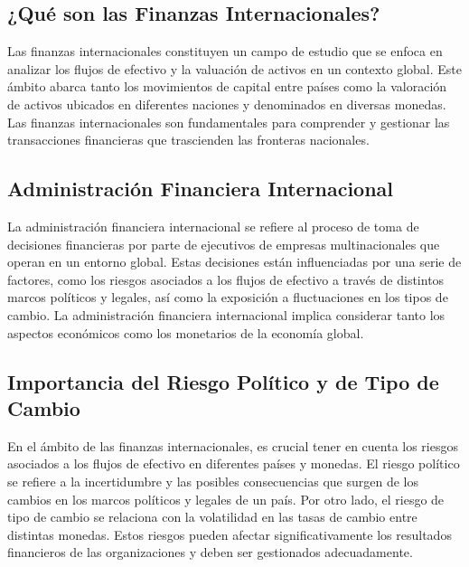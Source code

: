 \documentclass[
  a4paper,
]{article}
\begin{document}
\hypertarget{quuxe9-son-las-finanzas-internacionales}{%
\subsection{¿Qué son las Finanzas
Internacionales?}\label{quuxe9-son-las-finanzas-internacionales}}

Las finanzas internacionales constituyen un campo de estudio que se
enfoca en analizar los flujos de efectivo y la valuación de activos en
un contexto global. Este ámbito abarca tanto los movimientos de capital
entre países como la valoración de activos ubicados en diferentes
naciones y denominados en diversas monedas. Las finanzas internacionales
son fundamentales para comprender y gestionar las transacciones
financieras que trascienden las fronteras nacionales.

\hypertarget{administraciuxf3n-financiera-internacional}{%
\subsection{Administración Financiera
Internacional}\label{administraciuxf3n-financiera-internacional}}

La administración financiera internacional se refiere al proceso de toma
de decisiones financieras por parte de ejecutivos de empresas
multinacionales que operan en un entorno global. Estas decisiones están
influenciadas por una serie de factores, como los riesgos asociados a
los flujos de efectivo a través de distintos marcos políticos y legales,
así como la exposición a fluctuaciones en los tipos de cambio. La
administración financiera internacional implica considerar tanto los
aspectos económicos como los monetarios de la economía global.

\hypertarget{importancia-del-riesgo-poluxedtico-y-de-tipo-de-cambio}{%
\subsection{Importancia del Riesgo Político y de Tipo de
Cambio}\label{importancia-del-riesgo-poluxedtico-y-de-tipo-de-cambio}}

En el ámbito de las finanzas internacionales, es crucial tener en cuenta
los riesgos asociados a los flujos de efectivo en diferentes países y
monedas. El riesgo político se refiere a la incertidumbre y las posibles
consecuencias que surgen de los cambios en los marcos políticos y
legales de un país. Por otro lado, el riesgo de tipo de cambio se
relaciona con la volatilidad en las tasas de cambio entre distintas
monedas. Estos riesgos pueden afectar significativamente los resultados
financieros de las organizaciones y deben ser gestionados adecuadamente.
\end{document}
